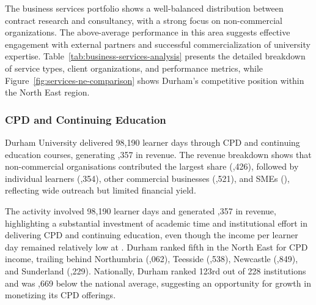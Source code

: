 \documentclass[journal,onecolumn, 10pt,draftclsnofoot]{IEEEtran}
\begin{document}
The business services portfolio shows a well-balanced distribution between contract research and consultancy, with a strong focus on non-commercial organizations. The above-average performance in this area suggests effective engagement with external partners and successful commercialization of university expertise. Table~\ref{tab:business-services-analysis} presents the detailed breakdown of service types, client organizations, and performance metrics, while Figure~\ref{fig:services-ne-comparison} shows Durham's competitive position within the North East region.

\subsubsection{CPD and Continuing Education}

Durham University delivered 98,190 learner days through CPD and continuing education courses, generating ,357 in revenue. The revenue breakdown shows that non-commercial organisations contributed the largest share (,426), followed by individual learners (,354), other commercial businesses (,521), and SMEs (), reflecting wide outreach but limited financial yield.

The activity involved 98,190 learner days and generated ,357 in revenue, highlighting a substantial investment of academic time and institutional effort in delivering CPD and continuing education, even though the income per learner day remained relatively low at . Durham ranked fifth in the North East for CPD income, trailing behind Northumbria (,062), Teesside (,538), Newcastle (,849), and Sunderland (,229). Nationally, Durham ranked 123rd out of 228 institutions and was ,669 below the national average, suggesting an opportunity for growth in monetizing its CPD offerings.
\end{document}
